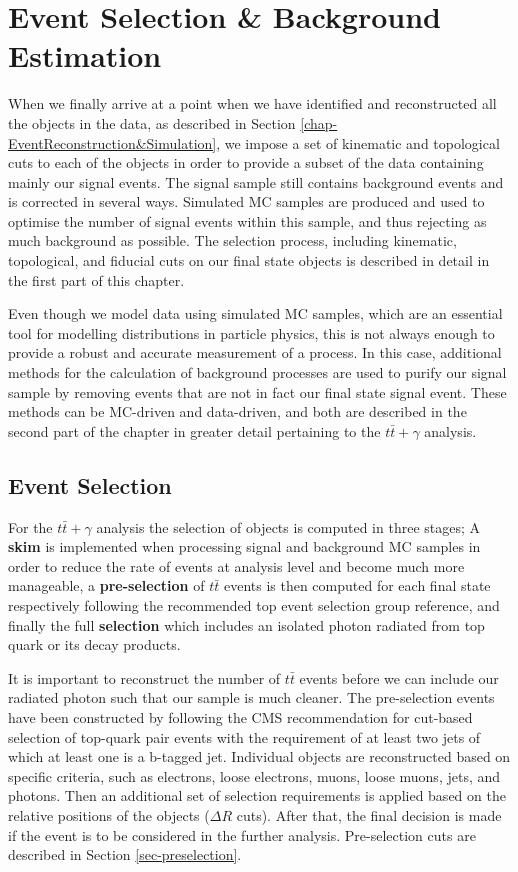 \chapter{Event Selection \& Background Estimation} \label{chap-EventSelection}

When we finally arrive at a point when we have identified and reconstructed all the objects in the data, as described in Section \ref{chap-EventReconstruction&Simulation}, we impose a set of kinematic and topological cuts to each of the objects in order to provide a subset of the data containing mainly our signal events. The signal sample still contains background events and is corrected in several ways. Simulated MC samples are produced and used to optimise the number of signal events within this sample, and thus rejecting as much background as possible. The selection process, including kinematic, topological, and fiducial cuts on our final state objects is described in detail in the first part of this chapter.

Even though we model data using simulated MC samples, which are an essential tool for modelling distributions in particle physics, this is not always enough to provide a robust and accurate measurement of a process. In this case, additional methods for the calculation of background processes are used to purify our signal sample by removing events that are not in fact our final state signal event. These methods can be MC-driven and data-driven, and both are described in the second part of the chapter in greater detail pertaining to the $t\bar{t}+\gamma$ analysis.  

\section{Event Selection} \label{sec-EventSelection}

For the $t\bar{t}+\gamma$ analysis the selection of objects is computed in three stages; A \textbf{skim} is implemented when processing signal and background MC samples in order to reduce the rate of events at analysis level and become much more manageable, a \textbf{pre-selection} of $t\bar{t}$ events is then computed for each final state respectively following the recommended top event selection group reference, and finally the full \textbf{selection} which includes an isolated photon radiated from top quark or its decay products.   

It is important to reconstruct the number of $t\bar{t}$ events before we can include our radiated photon such that our sample is much cleaner. 
The pre-selection events have been constructed by following the CMS recommendation for cut-based selection of top-quark pair events with the requirement of at least two jets of which at least one is a b-tagged jet. Individual objects are reconstructed based on specific criteria, such as electrons, loose electrons, muons, loose muons, jets, and photons. Then an additional set of selection requirements is applied based on the relative positions of the objects ($\Delta R$ cuts). After that, the final decision is made if the event is to be considered in the further analysis. Pre-selection cuts are described in Section \ref{sec-preselection}.

